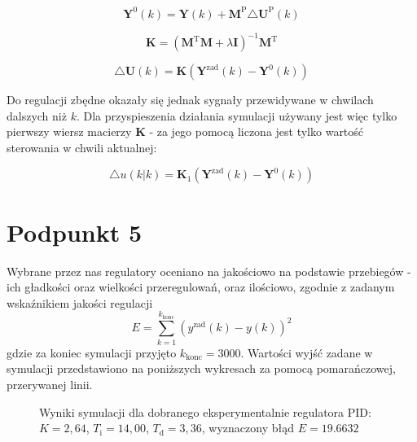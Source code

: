 \begin{equation}
\boldsymbol{Y}^{0}(k) = \boldsymbol{Y}(k) + \boldsymbol{M}^{\mathrm{P}} \triangle \boldsymbol{U}^{\mathrm{P}}(k)
\label{Y0k}
\end{equation}

\begin{equation}
\boldsymbol{K} = (\boldsymbol{M}^{\mathrm{T}} \boldsymbol{M} + \lambda \boldsymbol{I})^{-1} \boldsymbol{M}^{\mathrm{T}}
\label{Karray}
\end{equation}

\begin{equation}
\triangle \boldsymbol{U}(k) = \boldsymbol{K}(\boldsymbol{Y}^{\mathrm{zad}}(k) - \boldsymbol{Y}^{0}(k))
\label{dukdmc}
\end{equation}

Do regulacji zbędne okazały się jednak sygnały przewidywane w chwilach dalszych niż $k$. Dla przyspieszenia działania symulacji używany jest więc tylko pierwszy wiersz macierzy $\boldsymbol{K}$ - za jego pomocą liczona jest tylko wartość sterowania w chwili aktualnej:

\begin{equation}
	\triangle u(k|k) = \boldsymbol{K}_1 (\boldsymbol{Y}^{\mathrm{zad}}(k) - \boldsymbol{Y}^{0}(k))
\end{equation}

\chapter{Podpunkt 5}
Wybrane przez nas regulatory oceniano na jakościowo na podstawie przebiegów - ich gładkości oraz wielkości przeregulowań, oraz ilościowo, zgodnie z zadanym wskaźnikiem jakości regulacji
\begin{equation}
E = \sum_{k=1}^{k_{\mathrm{konc}}}(y^{\mathrm{zad}}(k) - y(k))^2
\label{E}
\end{equation}
gdzie za koniec symulacji przyjęto $k_{\mathrm{konc}}=3000$. Wartości wyjść zadane w symulacji przedstawiono na poniższych wykresach za pomocą pomarańczowej, przerywanej linii.

\begin{figure}[ht]
\centering
{}
\caption{Wyniki symulacji dla dobranego eksperymentalnie regulatora PID: \\$K = 2,64$, $T_{\mathrm{i}}=14,00$, $T_{\mathrm{d}}=3,36$, wyznaczony błąd $E=\num{19,6632}$}
\label{Z5manualPID}
\end{figure}


